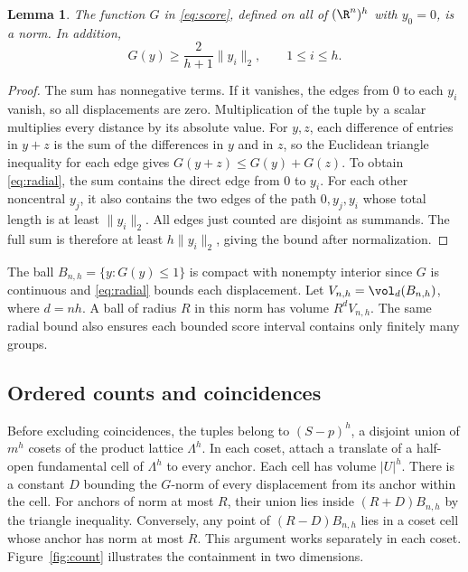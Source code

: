 \documentclass[11pt,a4paper]{article}
\newtheorem{lemma}{Lemma}
\theoremstyle{definition}
\begin{document}
\begin{lemma}\label{lem:norm}
The function \(G\) in \eqref{eq:score}, defined on all of \((\R^n)^h\) with \(y_0=0\), is a norm. In addition,
\begin{equation}\label{eq:radial}
G(y)\ge \frac{2}{h+1}\|y_i\|_2,\qquad 1\le i\le h.
\end{equation}
\end{lemma}

\begin{proof}
The sum has nonnegative terms. If it vanishes, the edges from \(0\) to each \(y_i\) vanish, so all displacements are zero. Multiplication of the tuple by a scalar multiplies every distance by its absolute value. For \(y,z\), each difference of entries in \(y+z\) is the sum of the differences in \(y\) and in \(z\), so the Euclidean triangle inequality for each edge gives \(G(y+z)\le G(y)+G(z)\). To obtain \eqref{eq:radial}, the sum contains the direct edge from \(0\) to \(y_i\). For each other noncentral \(y_j\), it also contains the two edges of the path \(0,y_j,y_i\) whose total length is at least \(\|y_i\|_2\). All edges just counted are disjoint as summands. The full sum is therefore at least \(h\|y_i\|_2\), giving the bound after normalization.
\end{proof}

The ball \(B_{n,h}=\{y:G(y)\le1\}\) is compact with nonempty interior since \(G\) is continuous and \eqref{eq:radial} bounds each displacement. Let \(V_{n,h}=\vol_d(B_{n,h})\), where \(d=nh\). A ball of radius \(R\) in this norm has volume \(R^d V_{n,h}\). The same radial bound also ensures each bounded score interval contains only finitely many groups.

\subsection{Ordered counts and coincidences}

Before excluding coincidences, the tuples belong to \((S-p)^h\), a disjoint union of \(m^h\) cosets of the product lattice \(\Lambda^h\). In each coset, attach a translate of a half-open fundamental cell of \(\Lambda^h\) to every anchor. Each cell has volume \(|U|^h\). There is a constant \(D\) bounding the \(G\)-norm of every displacement from its anchor within the cell. For anchors of norm at most \(R\), their union lies inside \((R+D)B_{n,h}\) by the triangle inequality. Conversely, any point of \((R-D)B_{n,h}\) lies in a coset cell whose anchor has norm at most \(R\). This argument works separately in each coset. Figure~\ref{fig:count} illustrates the containment in two dimensions.
\end{document}
